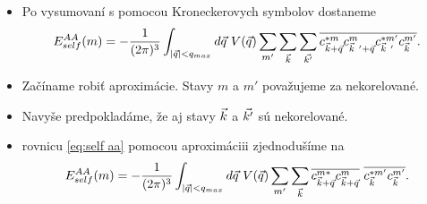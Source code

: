 \documentclass[
	11pt, %
]{beamer}
\begin{document}
\begin{frame}
\begin{itemize}
\item Po vysumovaní s pomocou Kroneckerovych symbolov dostaneme
\begin{align}
\label{eq:self aa}
E_{self}^{AA}(m)= - \frac{1}{(2\pi)^3}\int_{|\vq| < q_{max}} d\vq\ V(\vq) \sum_{m'}\sum_{\vk}\sum_{\vkp}\overline{c^{*m}_{\vk+\vq}c^{m}_{\vk\ '+\vq}c^{*m'}_{\vk\ '}c^{m'}_{\vk}}\text{.}
\end{align}
\item Začíname robiť aproximácie. Stavy $m$ a $m'$ považujeme za nekorelované. 
\item Navyše predpokladáme, že aj stavy $\vec{k}$ a $\vec{k'}$ sú nekorelované.
\item rovnicu \eqref{eq:self aa} pomocou aproximáciii zjednodušíme na
\begin{align}
\label{eq:05energy2}
E_{self}^{AA}(m)= - \frac{1}{(2\pi)^3} \int_{|\vq| < q_{max}} d\vq\ V(\vq) \sum_{m'}\sum_{\vk} \overline{c^{m*}_{\vk+\vq}c^{m}_{\vk+\vq}}\ \overline{c^{*m'}_{\vk}c^{m'}_{\vk}} \text{.}
\end{align}
\end{itemize}
\end{frame}
\end{document}

